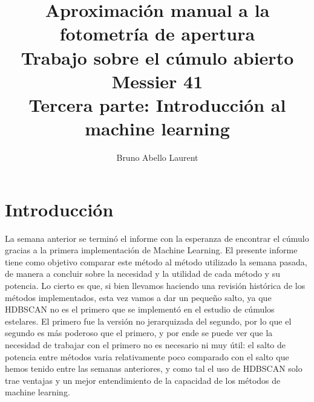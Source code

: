 \documentclass[10pt,twocolumn]{article}
\title{\textbf{Aproximación manual a la fotometría de apertura}\\Trabajo sobre el cúmulo abierto Messier 41\\Tercera parte: Introducción al machine learning}
\author[1]{Bruno Abello Laurent}
\affil[1]{Universidad de Los Andes, Departamento de Física, Colombia}
\date{}
\begin{document}


\section{Introducción}

La semana anterior se terminó el informe con la esperanza de encontrar el cúmulo gracias a la primera
implementación de Machine Learning. El presente informe tiene como objetivo comparar este método
al método utilizado la semana pasada, de manera a concluir sobre la necesidad y la utilidad de cada método
y su potencia. Lo cierto es que, si bien llevamos haciendo una revisión histórica de los métodos implementados, 
esta vez vamos a dar un pequeño salto, ya que HDBSCAN no es el primero que se implementó en el estudio de 
cúmulos estelares. El primero fue la versión no jerarquizada del segundo, por lo que el segundo es más poderoso
que el primero, y por ende se puede ver que la necesidad de trabajar con el primero no es necesario ni muy útil:
el salto de potencia entre métodos varia relativamente poco comparado con el salto que hemos tenido entre 
las semanas anteriores, y como tal el uso de HDBSCAN solo trae ventajas y un mejor entendimiento de la 
capacidad de los métodos de machine learning. 
\end{document}
